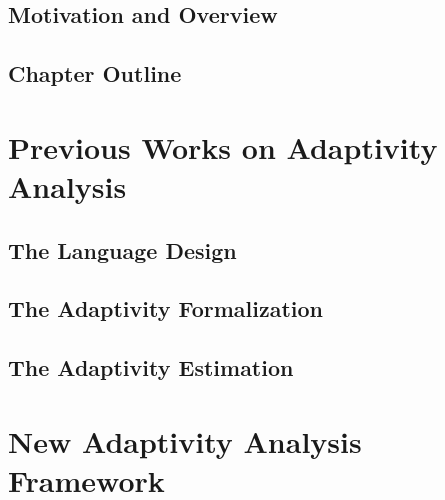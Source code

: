 \documentclass[12pt, letterpaper]{report}   %
\begin{document}
\section{Motivation and Overview}
\label{sec:adapt-motivation}


\section{Chapter Outline}
\label{sec:adapt-outline}


\chapter{Previous Works on Adaptivity Analysis}
\label{sec:prework}

%
\section{The Language Design}
\label{sec:prework-language}

%
\section{The Adaptivity Formalization}
\label{sec:prework-formalization}

%
\section{The Adaptivity Estimation}
\label{sec:prework-static}





\chapter{New Adaptivity Analysis Framework}
\label{sec:adapt-analysis}


% 
\clearpage
\end{document}

